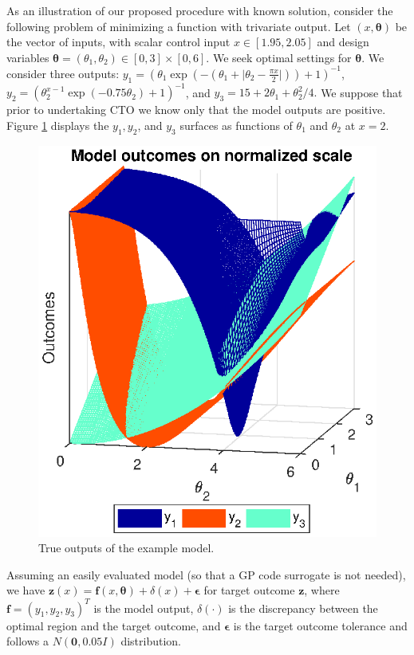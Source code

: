 \documentclass[12pt]{article}
\begin{document}
%
As an illustration of our proposed procedure with known solution, consider the following problem of minimizing a function with trivariate output. 
%
Let $(x,\boldsymbol \theta)$ be the vector of inputs, with scalar control input $x\in[1.95,2.05]$ and design variables $\boldsymbol \theta = (\theta_1,\theta_2)\in[0,3]\times[0,6]$.
%
We seek optimal settings for $\boldsymbol\theta$.
%
We consider three outputs:
%
$
y_1 = \left(\theta_1 \exp\left(-\left(\theta_1 + \lvert \theta_2-\frac{\pi x}2\rvert \right)\right)+1\right)^{-1}$, 
$
y_2 = \left(\theta_2^{x-1} \exp\left(-0.75 \theta_2\right) + 1 \right)^{-1}
$, and
$
y_3 = 15 + 2 \theta_1 + {\theta_2^2}/4.
$
%
We suppose that prior to undertaking CTO we know only that the model outputs are positive.
%
Figure \ref{fig:toy_sim_outputs} displays the $y_1, y_2$, and $y_3$ surfaces as functions of $\theta_1$ and $\theta_2$ at $x = 2$.
%
\begin{figure}
\centering
\includegraphics[scale=.8]{FIG_toy_sim_model_outputs.eps}
\caption{True outputs of the example model.}
\label{fig:toy_sim_outputs}
\end{figure}
%
Assuming an easily evaluated model (so that a GP code surrogate is not needed), we have
%
$
\mathbf z(x) = \mathbf f(x,\boldsymbol \theta) + \delta(x) + \boldsymbol\epsilon
$
%
for target outcome $\mathbf z$, where $\mathbf f = (y_1,y_2,y_3)^T$ is the model output, $\delta(\cdot)$ is the discrepancy between the optimal region and the target outcome, and $\boldsymbol \epsilon$ is the target outcome tolerance and follows a $N(\mathbf 0,0.05I)$ distribution. 
%
%
\end{document}
